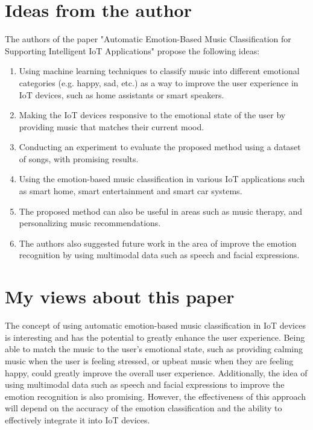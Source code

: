 \documentclass{report}
\begin{document}
    
\begin{multicols}{1}    
    \section*{Ideas from the author}
    
The authors of the paper "Automatic Emotion-Based Music Classification for Supporting Intelligent IoT Applications" propose the following ideas:

    
    \begin{enumerate}
        \item Using machine learning techniques to classify music into different emotional categories (e.g. happy, sad, etc.) as a way to improve the user experience in IoT devices, such as home assistants or smart speakers.
        \item Making the IoT devices responsive to the emotional state of the user by providing music that matches their current mood.
        \item Conducting an experiment to evaluate the proposed method using a dataset of songs, with promising results.
        \item Using the emotion-based music classification in various IoT applications such as smart home, smart entertainment and smart car systems.
        \item The proposed method can also be useful in areas such as music therapy, and personalizing music recommendations.
        \item The authors also suggested future work in the area of improve the emotion recognition by using multimodal data such as speech and facial expressions.
    \end{enumerate}
    

    \section*{My views about this paper}
   The concept of using automatic emotion-based music classification in IoT devices is interesting and has the potential to greatly enhance the user experience. Being able to match the music to the user's emotional state, such as providing calming music when the user is feeling stressed, or upbeat music when they are feeling happy, could greatly improve the overall user experience. Additionally, the idea of using multimodal data such as speech and facial expressions to improve the emotion recognition is also promising. However, the effectiveness of this approach will depend on the accuracy of the emotion classification and the ability to effectively integrate it into IoT devices.\\
    


\end{multicols}
\end{document}
